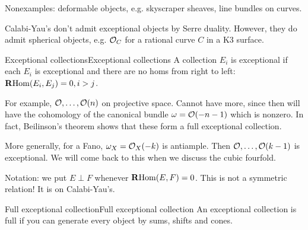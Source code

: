 Nonexamples: deformable objects, e.g. skyscraper sheaves, line bundles on curves.

\begin{remark}{}{}
    Calabi-Yau's don't admit exceptional objects by Serre duality. However, they do admit spherical objects, e.g. $\mathcal{O}_C$ for a rational curve $C$ in a K3 surface.
\end{remark}

\begin{definition}{Exceptional collections}{Exceptional collections}
    A collection $E_i$ is exceptional if each $E_i$ is exceptional and there are no homs from right to left: $\operatorname{\mathbf{R} Hom}(E_i,E_j)=0, i>j$.
\end{definition}

For example, $\mathcal{O},\dots,\mathcal{O}(n)$ on projective space. Cannot have more, since then will have the cohomology of the canonical bundle $\omega=\mathcal{O}(-n-1)$ which is nonzero. In fact, Beilinson's theorem shows that these form a full exceptional collection.

More generally, for a Fano, $\omega_X=\mathcal{O}_X(-k)$ is antiample. Then $\mathcal{O},\dots,\mathcal{O}(k-1)$ is exceptional. We will come back to this when we discuss the cubic fourfold.


Notation: we put $E \perp F$ whenever $\operatorname{\mathbf{R} Hom}(E,F)=0$. This is not a symmetric relation! It is on Calabi-Yau's.

\begin{definition}{Full exceptional collection}{Full exceptional collection}
    An exceptional collection is full if you can generate every object by sums, shifts and cones.
\end{definition}

